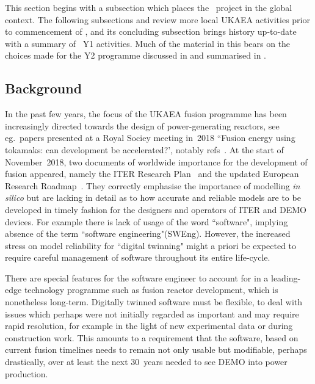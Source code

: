This section begins with a subsection  which places the \nep \ project in the global context.
The following subsections  and  review more local UKAEA activities 
prior to commencement of \nep, and its concluding subsection brings history up-to-date with
a summary of \nep \ Y1 activities. Much of the material in this  bears on the choices
made for the Y2 programme discussed in  and summarised in .

\subsection{Background}\label{sec:backgr}

In the past few years, the focus of the UKAEA fusion programme has been increasingly
directed towards the design of power-generating reactors, see eg.\ papers presented
at a Royal Sociey meeting in~2018 ``Fusion energy using tokamaks: can development be accelerated?',
notably refs~\cite{Wi19impa, Su19Engi}.
At the start of November~2018, two documents of worldwide importance for the development
of fusion appeared, namely the ITER Research Plan~\cite{iterrp} and the updated
European Research Roadmap~\cite{rdmap}. They correctly emphasise the importance
of modelling \emph{in silico} but are lacking in detail as to how accurate and reliable
models are to be developed in timely fashion for the designers and operators of ITER and DEMO devices.
For example there is lack of usage of the word ``software", implying absence
of the term ``software engineering"(SWEng). However, the increased stress on model
reliability for ``digital twinning" might a priori be expected to require careful management 
of software throughout its entire life-cycle.

There are special features for the software engineer to account for
in a leading-edge technology programme such as fusion reactor 
development, which is nonetheless long-term.  Digitally twinned software must be flexible, 
to deal with issues which perhaps were not initially regarded as important and may require
rapid resolution, for example in the light of new experimental data
or during construction work. This amounts to a requirement that the
software, based on current fusion timelines needs to remain not only usable but
modifiable, perhaps drastically, over at least the next $30$~years needed to see DEMO
into power production.

